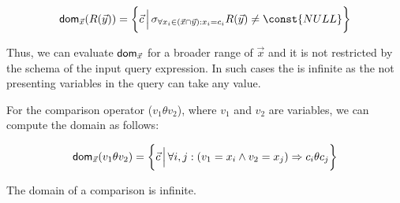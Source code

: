 \documentclass[12pt]{article}
\begin{document}

\begin{equation}
\label{def:relation}
\dom{}_{\vec x}(R(\vec y))=\bigg\{\vec c\,\Big|\,\sigma_{\forall x_i\in(\vec{x}\cap\vec{y}): x_{i}=c_{i}}R(\vec y)\not= \const{NULL}\bigg\}
\end{equation}

Thus, we can evaluate $\text{\textsf{dom}}_{\vec{x}}$ for a broader range of $\vec{x}$ and it is not restricted by the schema of the input query expression. In such cases the \dom{} is infinite as the not presenting variables in the query can take any value.

For the comparison operator ($v_{1}\theta v_{2}$), where $v_1$ and $v_2$ are variables, we can compute the domain as follows:

\begin{equation}
\text{\textsf{dom}{}}_{\vec{x}}(v_{1}\theta v_{2})=\bigg\{\vec{c}\,\Big|\,\forall i,j:(v_{1}=x_{i}\land v_{2}=x_{j})\Rightarrow c_{i}\theta c_{j}\bigg\}
\end{equation}

The domain of a comparison is infinite.
\end{document}
